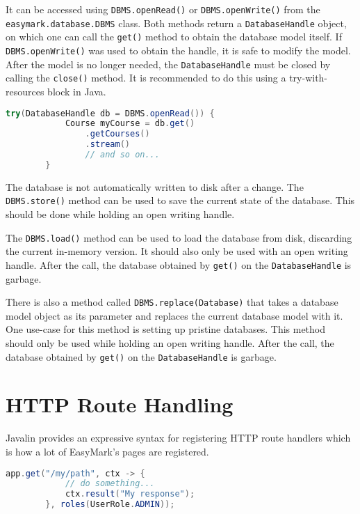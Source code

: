 \documentclass[12pt,a4paper]{report}
\begin{document}
	It can be accessed using \lstinline|DBMS.openRead()| or \lstinline|DBMS.openWrite()| from the \linebreak\lstinline|easymark.database.DBMS| class. Both methods return a \lstinline|DatabaseHandle| object, on which one can call the \lstinline|get()| method to obtain the database model itself. If \lstinline|DBMS.openWrite()| was used to obtain the handle, it is safe to modify the model. After the model is no longer needed, the \lstinline|DatabaseHandle| must be closed by calling the \lstinline|close()| method. It is recommended to do this using a try-with-resources block in Java.

	\begin{lstlisting}[language=Java]
		try(DatabaseHandle db = DBMS.openRead()) {
			Course myCourse = db.get()
				.getCourses()
				.stream()
				// and so on...
		}
	\end{lstlisting}

	The database is not automatically written to disk after a change. The \lstinline|DBMS.store()| method can be used to save the current state of the database. This should be done while holding an open writing handle.

	The \lstinline|DBMS.load()| method can be used to load the database from disk, discarding the current in-memory version. It should also only be used with an open writing handle. After the call, the database obtained by \lstinline|get()| on the \lstinline|DatabaseHandle| is garbage.

	There is also a method called \lstinline|DBMS.replace(Database)| that takes a database model object as its parameter and replaces the current database model with it. One use-case for this method is setting up pristine databases. This method should only be used while holding an open writing handle. After the call, the database obtained by \lstinline|get()| on the \lstinline|DatabaseHandle| is garbage.

	\section{HTTP Route Handling}
	Javalin provides an expressive syntax for registering HTTP route handlers which is how a lot of EasyMark's pages are registered.

	\begin{lstlisting}[language=Java]
		app.get("/my/path", ctx -> {
			// do something...
			ctx.result("My response");
		}, roles(UserRole.ADMIN));
	\end{lstlisting}
\end{document}
